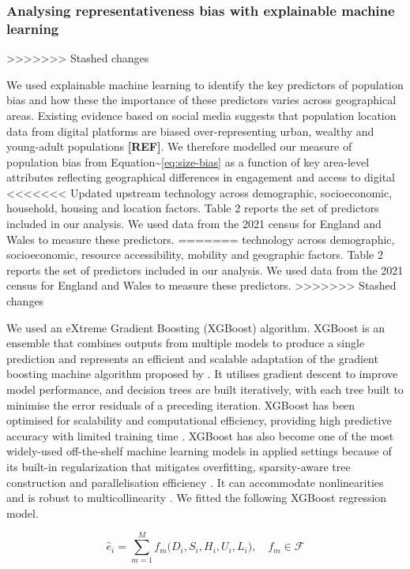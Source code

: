 \documentclass[]{rsos}%
\begin{document}
\subsubsection{Analysing representativeness bias with explainable machine learning}\label{sec-eml}
>>>>>>> Stashed changes

We used explainable machine learning to identify the key predictors of
population bias and how these the importance of these predictors varies
across geographical areas. Existing evidence based on social media
suggests that population location data from digital platforms are biased
over-representing urban, wealthy and young-adult populations \textbf{{[}REF{]}}.
We therefore modelled our measure of population bias from
Equation\textasciitilde{}\ref{eq:size-bias} as a function of key area-level attributes
reflecting geographical differences in engagement and access to digital
<<<<<<< Updated upstream
technology across demographic, socioeconomic, household, housing and
location factors. Table 2 reports the set of predictors included in our
analysis. We used data from the 2021 census for England and Wales to
measure these predictors.
=======
technology across demographic, socioeconomic, resource accessibility,
mobility and geographic factors. Table 2 reports the set of predictors
included in our analysis. We used data from the 2021 census for England
and Wales to measure these predictors.
>>>>>>> Stashed changes

We used an eXtreme Gradient Boosting (XGBoost) algorithm. XGBoost is an
ensemble that combines outputs from multiple models to produce a single
prediction and represents an efficient and scalable adaptation of the
gradient boosting machine algorithm proposed by \citep{friedman2001a}. It
utilises gradient descent to improve model performance, and decision
trees are built iteratively, with each tree built to minimise the error
residuals of a preceding iteration. XGBoost has been optimised for
scalability and computational efficiency, providing high predictive
accuracy with limited training time \citep{chen2016, nielsen2016tree}.
XGBoost has also become one of the most widely-used off-the-shelf
machine learning models in applied settings because of its built-in
regularization that mitigates overfitting, sparsity-aware tree
construction and parallelisation efficiency \citep{chen2016}. It can
accommodate nonlinearities and is robust to multicollinearity
\citep{chen2016}. We fitted the following XGBoost regression model.

\begin{equation} \label{eq:xgb-model}
\widehat{e}_i 
= \sum_{m=1}^M f_m\bigl(D_i, S_i, H_i, U_i, L_i\bigr),
\quad f_m \in \mathcal{F}
\end{equation}
\end{document}
